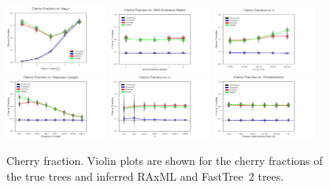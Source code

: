 \begin{figure} %
\centering
\includegraphics[width=0.3\textwidth]{figs/dualbirth-cherry-fraction-supp-a}
\includegraphics[width=0.3\textwidth]{figs/dualbirth-cherry-fraction-supp-b}
\includegraphics[width=0.3\textwidth]{figs/dualbirth-cherry-fraction-supp-c}\\
\includegraphics[width=0.3\textwidth]{figs/dualbirth-cherry-fraction-supp-d}
\includegraphics[width=0.3\textwidth]{figs/dualbirth-cherry-fraction-supp-e}
\includegraphics[width=0.3\textwidth]{figs/dualbirth-cherry-fraction-supp-f}
\caption[True and Estimated Cherry Fraction]
{Cherry fraction. Violin plots are shown for the cherry fractions of the true trees and inferred RAxML and FastTree~2 trees.}
\label{fig:dualbirth-cherry-fraction-supp}
\end{figure}

